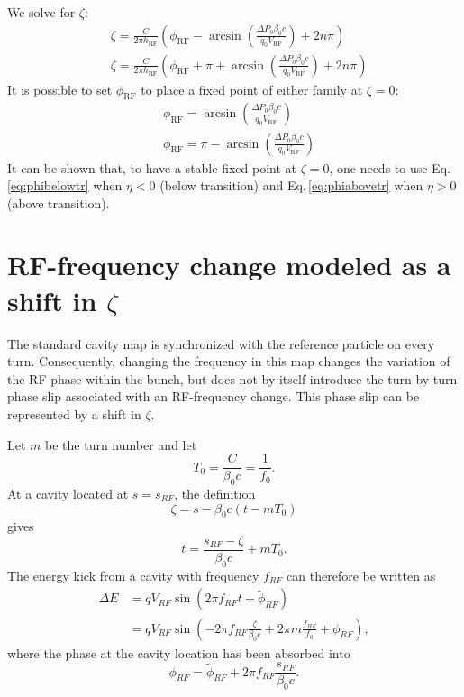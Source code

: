 We solve for $\zeta$:
\begin{align}
&\zeta =
 \frac{C}{2 \pi h_\text{RF}} \left(
 \phi_\text{RF}
 -\arcsin\left(\frac{\Delta P_0\beta_0 c }{q_0 V_\text{RF}} \right)
 +2 n \pi
 \right)\\
 &\zeta =
 \frac{C}{2 \pi h_\text{RF}} \left(
 \phi_\text{RF} + \pi
 +\arcsin\left(\frac{\Delta P_0\beta_0 c }{q_0 V_\text{RF}} \right)
 +2 n \pi
 \right)
\end{align}
It is possible to set $\phi_\text{RF}$ to place a fixed point of either family at $\zeta = 0$:
\begin{align}
&\phi_\text{RF} =
 \arcsin\left(\frac{\Delta P_0\beta_0 c }{q_0 V_\text{RF}} \right)
 \label{eq:phibelowtr}
 \\
 & \phi_\text{RF} =
 \pi
 - \arcsin\left(\frac{\Delta P_0\beta_0 c }{q_0 V_\text{RF}} \right)
  \label{eq:phiabovetr}
\end{align}
It can be shown that, to have a stable fixed point at $\zeta=0$, one needs to use Eq.\,\ref{eq:phibelowtr} when $\eta<0$ (below transition) and Eq.\,\ref{eq:phiabovetr} when $\eta>0$ (above transition).


\section{RF-frequency change modeled as a shift in $\zeta$}

The standard cavity map is synchronized with the reference particle on every
turn. Consequently, changing the frequency in this map changes the variation of
the RF phase within the bunch, but does not by itself introduce the turn-by-turn
phase slip associated with an RF-frequency change. This phase slip can be
represented by a shift in $\zeta$.

Let $m$ be the turn number and let
\begin{equation}
T_0=\frac{C}{\beta_0 c}=\frac{1}{f_0}.
\end{equation}
At a cavity located at $s=s_{RF}$, the definition
\begin{equation}
\zeta=s-\beta_0c\left(t-mT_0\right)
\end{equation}
gives
\begin{equation}
t=\frac{s_{RF}-\zeta}{\beta_0c}+mT_0.
\end{equation}
The energy kick from a cavity with frequency $f_{RF}$ can therefore be written as
\begin{align}
\Delta E
&=qV_{RF}\sin\left(2\pi f_{RF}t+\widetilde{\phi}_{RF}\right)\\
&=qV_{RF}\sin\left(
-2\pi f_{RF}\frac{\zeta}{\beta_0c}
+2\pi m\frac{f_{RF}}{f_0}+\phi_{RF}\right),
\label{eq:rf_kick_absolute_time}
\end{align}
where the phase at the cavity location has been absorbed into
\begin{equation}
\phi_{RF}=\widetilde{\phi}_{RF}
+2\pi f_{RF}\frac{s_{RF}}{\beta_0c}.
\end{equation}

